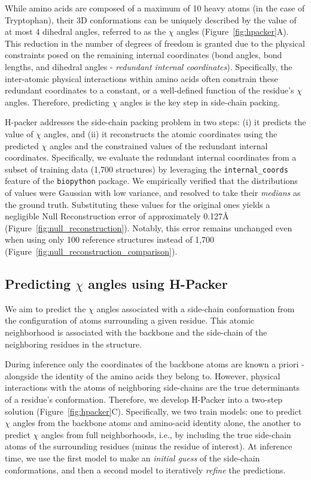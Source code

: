 While amino acids are composed of a maximum of 10 heavy atoms (in the case of Tryptophan), their 3D
conformations can be uniquely described by the value of at most 4 dihedral angles, referred to as
the $\chi$ angles (Figure~\ref{fig:hpacker}A). This reduction in the number of degrees of freedom
is granted due to the physical constraints posed on the remaining internal coordinates (bond
angles, bond lengths, and dihedral angles - \textit{redundant internal coordinates}). Specifically,
the inter-atomic physical interactions within amino acids often constrain these redundant
coordinates to a constant, or a well-defined function of the residue's $\chi$ angles. Therefore,
predicting $\chi$ angles is the key step in side-chain packing.

H-packer addresses the side-chain packing problem in two steps: (i) it predicts the value of $\chi$
angles, and (ii) it reconstructs the atomic coordinates using the predicted $\chi$ angles and the
constrained values of the redundant internal coordinates. Specifically, we evaluate the redundant
internal coordinates from a subset of training data (1,700 structures) by leveraging the
\texttt{internal\_coords} feature of the \texttt{biopython} package. We empirically verified that
the distributions of values were Gaussian with low variance, and resolved to take their
\textit{medians} as the ground truth. Substituting these values for the original ones yields a
negligible Null Reconstruction error of approximately
0.127\AA\,(Figure~\ref{fig:null_reconstruction}). Notably, this error remains unchanged even when
using only 100 reference structures instead of 1,700
(Figure~\ref{fig:null_reconstruction_comparison}).

\subsection{Predicting $\chi$ angles using H-Packer}
We aim to predict the $\chi$ angles associated with a side-chain conformation from the
configuration of atoms surrounding a given residue. This atomic neighborhood is associated with the
backbone and the side-chain of the neighboring residues in the structure.

During inference only the coordinates of the backbone atoms are known a priori - alongside the
identity of the amino acids they belong to. However, physical interactions with the atoms of
neighboring side-chains are the true determinants of a residue's conformation. Therefore, we
develop H-Packer into a two-step solution (Figure~\ref{fig:hpacker}C). Specifically, we two train
models: one to predict $\chi$ angles from the backbone atoms and amino-acid identity alone, the
another to predict $\chi$ angles from full neighborhoods, i.e., by including the true side-chain
atoms of the surrounding residues (minus the residue of interest). At inference time, we use the
first model to make an \textit{initial guess} of the side-chain conformations, and then a second
model to iteratively \textit{refine} the predictions.

